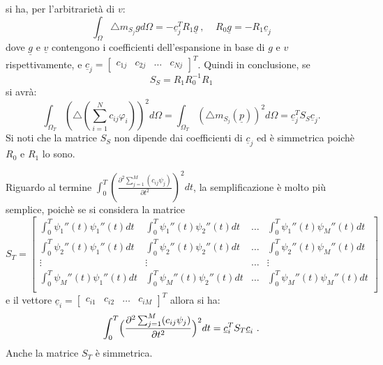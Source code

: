 \documentclass[a4paper,11pt,twoside,openright]{book}							%
\begin{document}
si ha, per l'arbitrarietà di $v$: 
$$ \int_\Omega \triangle m_{S_j} g d \Omega= - \underline c_j^T R_1 \underline g \ , \ \ \ \ \ R_0 \underline g = - R_1 \underline c_j  $$
dove $\underline g$ e $\underline v$ contengono i coefficienti dell'espansione in base di $g$ e $v$ rispettivamente, e $\underline c_j =
\begin{bmatrix}
c_{1j} & c_{2j} & \hdots & c_{Nj}
\end{bmatrix}^T$.
Quindi in conclusione, se 
$$
S_S = R_1 R_0^{-1} R_1
$$
si avrà:
$$
\int_{\Omega_T} ( \triangle(\sum_{i=1}^N  c_{ij}\varphi_i ) )^2 d \Omega = \int_{\Omega_T} (\triangle m_{S_j}(\underline p))^2 d \Omega  =\underline c^T_j S_S \underline c_j .
$$
Si noti che la matrice $S_S$ non dipende dai coefficienti di $\underline c_j$ ed è simmetrica poichè $R_0$ e $R_1$ lo sono.

Riguardo al termine $\int_0^T (\frac{\partial^2 \sum_{j=1}^M(c_{ij}\psi_j) }{\partial t ^2} )^2 dt$, la semplificazione è molto più semplice, poichè se si considera la matrice
 $$ S_T = \begin{bmatrix}
\int_0^T \psi_1''(t) \psi_1''(t) dt  & \int_0^T \psi_1''(t) \psi_2''(t) dt & \hdots & \int_0^T \psi_1''(t) \psi_M''(t) dt  \\
\int_0^T \psi_2''(t) \psi_1''(t) dt  & \int_0^T \psi_2''(t) \psi_2''(t) dt & \hdots & \int_0^T \psi_2''(t) \psi_M''(t) dt  \\
\vdots & \vdots & \hdots & \vdots \\
\int_0^T \psi_M''(t) \psi_1''(t) dt  & \int_0^T \psi_M''(t) \psi_2''(t) dt & \hdots & \int_0^T \psi_M''(t) \psi_M''(t) dt  \\
\end{bmatrix} $$
e il vettore $
\underline c_i =
\begin{bmatrix}
c_{i1} & c_{i2} & \hdots & c_{iM}
\end{bmatrix}^T$ allora si ha:
$$
\int_0^T \Bigl( \frac{\partial^2 \sum_{j=1}^M(c_{ij}\psi_j) }{\partial t ^2} \Bigr)^2 dt =\underline c_i^T  S_T \underline c_i \ .
$$
Anche la matrice $S_T$ è simmetrica.
\end{document}
